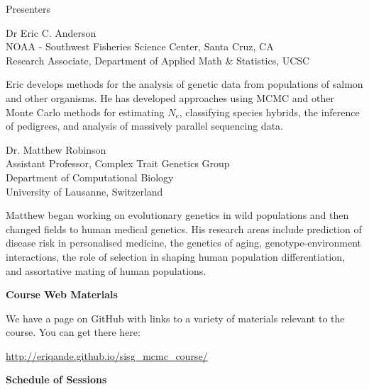 
\vspace*{1in}
\begin{center}\color{section0}\bf\Large
\coursetitlepage
\end{center}
\es\bs

\begin{center}\color{section0} Presenters\end{center}
\enlargethispage*{1000pt}

{\small
{\color{section0}Dr Eric C. Anderson\\
NOAA - Southwest Fisheries Science Center, Santa Cruz, CA\\
Research Associate, Department of Applied Math \& Statistics, UCSC}

Eric develops methods for the analysis of genetic data from populations of salmon and other organisms.  He has developed approaches using MCMC and other Monte Carlo methods for estimating $N_e$, classifying species hybrids, the inference of pedigrees, and analysis of massively parallel sequencing data.

{\color{section0}Dr. Matthew Robinson \\
Assistant Professor, Complex Trait Genetics Group\\
Department of Computational Biology \\
University of Lausanne, Switzerland}
  
Matthew began working on evolutionary genetics in wild populations and then changed fields to human 
medical genetics.  His research areas include 
prediction of disease risk in personalised medicine, the genetics of aging,
genotype-environment interactions, the role of selection in shaping human
population differentiation, and assortative mating of human populations.

}

\es\bs
\begin{center}
{\color{section0}\bf\Large Course Web Materials}
\end{center}
\vspace*{.25in}
\enlargethispage*{1000pt}

We have a page on GitHub with links to a variety of materials relevant to the course.
You can get there here:

\url{http://eriqande.github.io/sisg_mcmc_course/}

\es\bs
\begin{center}
{\color{section0}\bf\Large Schedule of Sessions}
\vspace*{.25in}
\enlargethispage*{1000pt}

%

%

\end{center}


